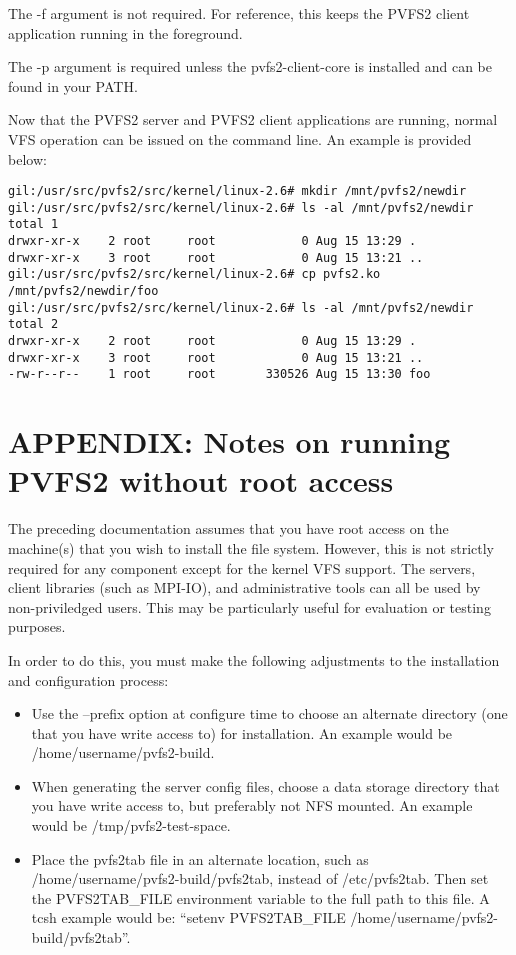 \documentclass[11pt, letterpaper]{article}
\begin{document}
The -f argument is not required.  For reference, this keeps the PVFS2
client application running in the foreground.

The -p argument is required unless the pvfs2-client-core is installed
and can be found in your PATH.

Now that the PVFS2 server and PVFS2 client applications are running,
normal VFS operation can be issued on the command line.  An example is
provided below:

\begin{verbatim}
gil:/usr/src/pvfs2/src/kernel/linux-2.6# mkdir /mnt/pvfs2/newdir
gil:/usr/src/pvfs2/src/kernel/linux-2.6# ls -al /mnt/pvfs2/newdir
total 1
drwxr-xr-x    2 root     root            0 Aug 15 13:29 .
drwxr-xr-x    3 root     root            0 Aug 15 13:21 ..
gil:/usr/src/pvfs2/src/kernel/linux-2.6# cp pvfs2.ko
/mnt/pvfs2/newdir/foo
gil:/usr/src/pvfs2/src/kernel/linux-2.6# ls -al /mnt/pvfs2/newdir
total 2
drwxr-xr-x    2 root     root            0 Aug 15 13:29 .
drwxr-xr-x    3 root     root            0 Aug 15 13:21 ..
-rw-r--r--    1 root     root       330526 Aug 15 13:30 foo
\end{verbatim}

\appendix

\section{APPENDIX: Notes on running PVFS2 without root access}

The preceding documentation assumes that you have root access on the
machine(s) that you wish to install the file system.  However, this is not
strictly required for any component except for the kernel VFS support.  The
servers, client libraries (such as MPI-IO), and administrative tools can all
be used by non-priviledged users.  This may be particularly useful for
evaluation or testing purposes.

In order to do this, you must make the following adjustments to the
installation and configuration process:
\begin{itemize}
\item Use the --prefix option at configure time to choose an alternate
directory (one that you have write access to) for installation.  An example
would be /home/username/pvfs2-build.
\item When generating the server config files, choose a data storage
directory that you have write access to, but preferably not NFS mounted.  An
example would be /tmp/pvfs2-test-space.
\item Place the pvfs2tab file in an alternate location, such as
/home/username/pvfs2-build/pvfs2tab, instead of /etc/pvfs2tab.
Then set the PVFS2TAB\_FILE environment variable to the full path
to this file.  A tcsh example would be: ``setenv PVFS2TAB\_FILE
/home/username/pvfs2-build/pvfs2tab''.
\end{itemize}
\end{document}
